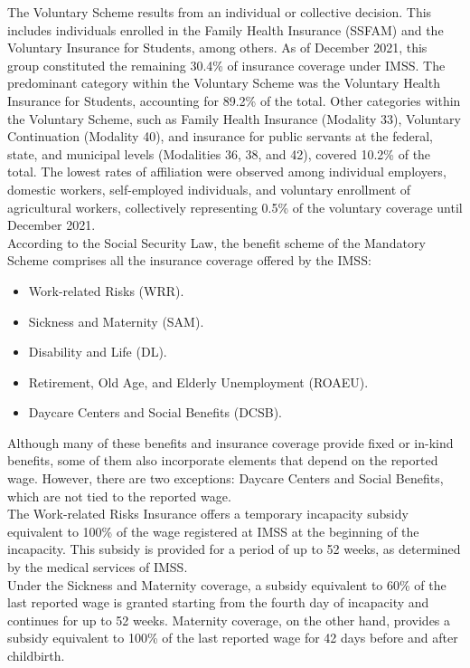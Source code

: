 \documentclass[10pt, oneside]{book}
\begin{document}
The Voluntary Scheme results from an individual or collective decision. This includes individuals enrolled in the Family Health Insurance (SSFAM) and the Voluntary Insurance for Students, among others. As of December 2021, this group constituted the remaining 30.4\% of insurance coverage under IMSS. The predominant category within the Voluntary Scheme was the Voluntary Health Insurance for Students, accounting for 89.2\% of the total. Other categories within the Voluntary Scheme, such as Family Health Insurance (Modality 33), Voluntary Continuation (Modality 40), and insurance for public servants at the federal, state, and municipal levels (Modalities 36, 38, and 42), covered 10.2\% of the total. The lowest rates of affiliation were observed among individual employers, domestic workers, self-employed individuals, and voluntary enrollment of agricultural workers, collectively representing 0.5\% of the voluntary coverage until December 2021. \\

According to the Social Security Law, the benefit scheme of the Mandatory Scheme comprises all the insurance coverage offered by the IMSS:

\begin{itemize}
    \item Work-related Risks (WRR).
    \item Sickness and Maternity (SAM).
    \item Disability and Life (DL).
    \item Retirement, Old Age, and Elderly Unemployment (ROAEU).
    \item Daycare Centers and Social Benefits (DCSB). 
\end{itemize}

Although many of these benefits and insurance coverage provide fixed or in-kind benefits, some of them also incorporate elements that depend on the reported wage. However, there are two exceptions: Daycare Centers and Social Benefits, which are not tied to the reported wage. \\

The Work-related Risks Insurance offers a temporary incapacity subsidy equivalent to 100\% of the wage registered at IMSS at the beginning of the incapacity. This subsidy is provided for a period of up to 52 weeks, as determined by the medical services of IMSS. \\

Under the Sickness and Maternity coverage, a subsidy equivalent to 60\% of the last reported wage is granted starting from the fourth day of incapacity and continues for up to 52 weeks. Maternity coverage, on the other hand, provides a subsidy equivalent to 100\% of the last reported wage for 42 days before and after childbirth. \\
\end{document}
